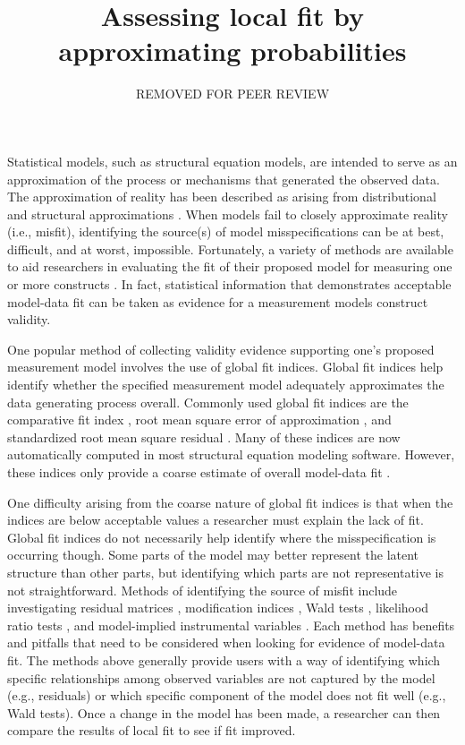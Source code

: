 \documentclass[man, noextraspace, floatsintext, 12pt]{apa7}
\title{Assessing local fit by approximating probabilities}
\author{REMOVED FOR PEER REVIEW}
\begin{document}
\maketitle

\setlength{\abovedisplayskip}{3pt}
\setlength{\belowdisplayskip}{3pt}

Statistical models, such as structural equation models, are intended to serve as an approximation of the process or mechanisms that generated the observed data.
The approximation of reality has been described as arising from distributional and structural approximations \citep{Bollen2019}.
When models fail to closely approximate reality (i.e., misfit), identifying the source(s) of model misspecifications can be at best, difficult, and at worst, impossible.
Fortunately, a variety of methods are available to aid researchers in evaluating the fit of their proposed model for measuring one or more constructs \citep{DiStefano2016}. 
In fact, statistical information that demonstrates acceptable model-data fit can be taken as evidence for a measurement models construct validity.

One popular method of collecting validity evidence supporting one's proposed measurement model involves the use of global fit indices.
Global fit indices help identify whether the specified measurement model adequately approximates the data generating process overall. 
Commonly used global fit indices are the comparative fit index \citep{Bentler1990},  root mean square error of approximation \citep{Browne1992}, and standardized root mean square residual \citep{Bentler1995, Maydeu2018, Joreskog1981}.
Many of these indices are now automatically computed in most structural equation modeling software.
However, these indices only provide a coarse estimate of overall model-data fit \citep{Steiger2007}.

One difficulty arising from the coarse nature of global fit indices is that when the indices are below acceptable values a researcher must explain the lack of fit. 
Global fit indices do not necessarily help identify where the misspecification is occurring though.
Some parts of the model may better represent the latent structure than other parts, but identifying which parts are not representative is not straightforward.
Methods of identifying the source of misfit include investigating residual matrices \citep{Kline2015, Maydeu2017}, modification indices \citep{Sorbom1989, Kaplan1989}, Wald tests \citep{Wald1943, Buse1982}, likelihood ratio tests \citep{Neyman1928, Buse1982}, and model-implied instrumental variables \citep{Bollen1995, Bollen2019}.
Each method has benefits and pitfalls that need to be considered when looking for evidence of model-data fit. 
The methods above generally provide users with a way of identifying which specific relationships among observed variables are not captured by the model (e.g., residuals) or which specific component of the model does not fit well (e.g., Wald tests).
Once a change in the model has been made, a researcher can then compare the results of local fit to see if fit improved.
\end{document}
